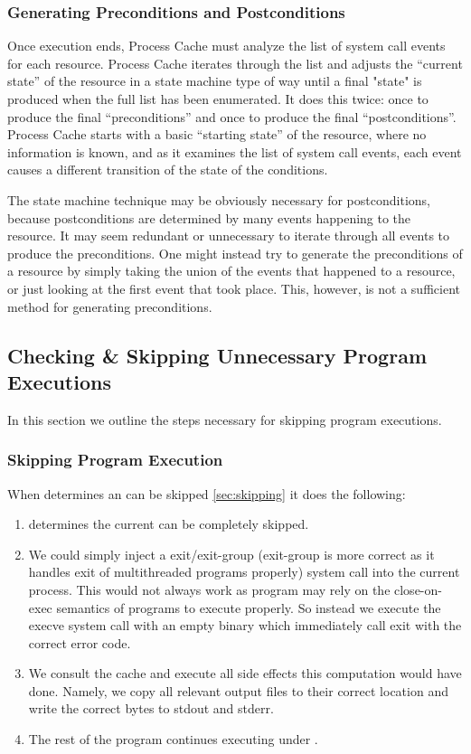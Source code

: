 \subsubsection{Generating Preconditions and Postconditions}
Once execution ends, Process Cache must analyze the list of system call events for each resource. Process Cache iterates through the list and adjusts the “current state” of the resource in a state machine type of way until a final "state" is produced when the full list has been enumerated. It does this twice: once to produce the final “preconditions” and once to produce the final “postconditions”. Process Cache starts with a basic “starting state” of the resource, where no information is known, and as it examines the list of system call events, each event causes a different transition of the state of the conditions.

The state machine technique may be obviously necessary for postconditions, because postconditions are determined by many events happening to the resource. It may seem redundant or unnecessary to iterate through all events to produce the preconditions. One might instead try to generate the preconditions of a resource by simply taking the union of the events that happened to a resource, or just looking at the first event that took place. This, however, is not a sufficient method for generating preconditions.

\subsection{Checking \& Skipping Unnecessary Program Executions}
In this section we outline the steps necessary for skipping program executions.
\subsubsection{Skipping Program Execution}
\label{sec:skipping-program-execution}
When \pc determines an \cacheunit{} can be skipped \ref{sec:skipping} it does the following:
\begin{enumerate}
  \item \pc determines the current \cacheunit{} can be completely skipped.
  \item We could simply inject a exit/exit-group (exit-group is more correct as it handles exit of multithreaded programs properly) system call into the current process. This would not always work as program may rely on
  the close-on-exec semantics of programs to execute properly. So instead we execute the execve system call with an empty binary which immediately call exit with the correct error code.
  \item We consult the cache and execute all side effects this computation would have done. Namely, we copy all relevant output files to their correct location and write the correct bytes to stdout and stderr.
  \item The rest of the program continues executing under \pc.
\end{enumerate}

